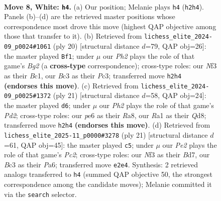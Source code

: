 \documentclass[11pt]{article}
\begin{document}
\begin{figure}[p]\centering
\begin{subfigure}{0.46\textwidth}\centering
\resizebox{\linewidth}{!}{%
\newchessgame
\chessboard[
  setfen={r1b2rk1/ppppqppp/2n1pn2/8/2PP4/2B2NP1/PP2PP1P/R2QKB1R w KQ - 1 8},
  showmover=false,
  pgfstyle=straightmove, color=movearrow, markmove={h2-h4}
]}
\caption{}
\end{subfigure}\hfill
\begin{subfigure}{0.46\textwidth}\centering
\resizebox{\linewidth}{!}{%
\newchessgame
\chessboard[
  setfen={r2n1rk1/pppqnppp/3bp3/3p4/3P1P2/2P2NPP/PP3PB1/R1BQK2R w KQ - 5 11},
  showmover=false,
  pgfstyle=straightmove, color=movearrow, markmove={g2-f1}
]}
\caption{}
\end{subfigure}
\\[4pt]
\begin{subfigure}{0.46\textwidth}\centering
\resizebox{\linewidth}{!}{%
\newchessgame
\chessboard[
  setfen={r1bq1rk1/pppp1pb1/2n3p1/4p2p/2P5/P1NPPN2/1P1QBPPP/R4RK1 b - - 7 11},
  showmover=false,
  pgfstyle=straightmove, color=movearrow, markmove={d7-d6}
]}
\caption{}
\end{subfigure}\hfill
\begin{subfigure}{0.46\textwidth}\centering
\resizebox{\linewidth}{!}{%
\newchessgame
\chessboard[
  setfen={r2qkb1r/2pb1ppp/p3pn2/1p6/3P4/P1N1PN2/1P2QPPP/R1B2RK1 b kq - 1 11},
  showmover=false,
  pgfstyle=straightmove, color=movearrow, markmove={c7-c5}
]}
\caption{}
\end{subfigure}
\caption{\textbf{Move 8, White: \texttt{h4}.} (a) Our position; Melanie plays \texttt{h4} (\texttt{h2h4}). Panels (b)--(d) are the retrieved master positions whose correspondence most drove this move (highest QAP objective among those that transfer to it). (b) Retrieved from \texttt{lichess\_elite\_2024-09\_p0024\#1061} (ply 20) [structural distance $d$=79, QAP obj=26]: the master played \texttt{Bf1}; under $\mu$ our \emph{Ph2} plays the role of that game's \emph{Bg2} (a \textbf{cross-type} correspondence); cross-type roles: our \emph{N}f3 as their \emph{B}c1, our \emph{B}c3 as their \emph{P}c3; transferred move \texttt{h2h4} \textbf{(endorses this move)}. (c) Retrieved from \texttt{lichess\_elite\_2024-09\_p0025\#1372} (ply 21) [structural distance $d$=58, QAP obj=24]: the master played \texttt{d6}; under $\mu$ our \emph{Ph2} plays the role of that game's \emph{Pd2}; cross-type roles: our \emph{p}e6 as their \emph{R}a8, our \emph{R}a1 as their \emph{Q}d8; transferred move \texttt{h2h4} \textbf{(endorses this move)}. (d) Retrieved from \texttt{lichess\_elite\_2025-11\_p0000\#3278} (ply 21) [structural distance $d$=61, QAP obj=45]: the master played \texttt{c5}; under $\mu$ our \emph{Pe2} plays the role of that game's \emph{Pc2}; cross-type roles: our \emph{N}f3 as their \emph{B}d7, our \emph{B}c3 as their \emph{P}a6; transferred move \texttt{e2e4}. Synthesis: 2 retrieved analogs transferred to \texttt{h4} (summed QAP objective 50, the strongest correspondence among the candidate moves); Melanie committed it via the \texttt{search} selector.}
\label{fig:thought-m14}
\end{figure}
\end{document}
